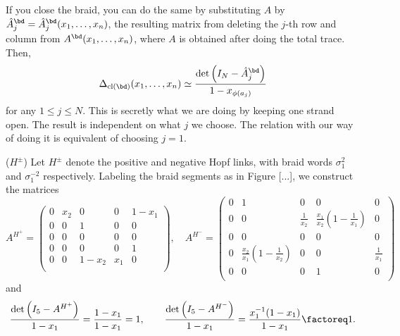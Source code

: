 \documentclass[11pt,e-only]{amsart}
\begin{document}
\begin{remark}
    If you close the braid, you can do the same by substituting $A$ by $\hat{A}_j^\bd=\hat{A}^\bd_j(x_1,\dots,x_n)$, the resulting matrix from deleting the $j$-th row and column from $A^\bd(x_1,\dots,x_n)$, where $A$ is obtained after doing the total trace. Then,
\begin{equation}
    \Delta_{\mathrm{cl}(\bd)}(x_1,\dots,x_n) \simeq \frac{\det{\left(I_{N}-\hat{A}^\bd_j\right)}}{1-x_{\phi(a_j)}}
\end{equation}
for any $1 \leq j\leq N$. This is secretly what we are doing by keeping one strand open. The result is independent on what $j$ we choose. The relation with our way of doing it is equivalent of choosing $j=1$.
\end{remark}

\begin{example} ($H^\pm$) Let $H^{\pm}$ denote the positive and negative Hopf links, with braid words $\sigma_1^2$ and $\sigma_1^{-2}$ respectively. Labeling the braid segments as in Figure [...], we construct the matrices
\begin{equation}
    A^{H^+}=\begin{pmatrix}
    0 & x_2 & 0 & 0 & 1-x_1 \\
    0 & 0 & 1 & 0 & 0\\
    0 & 0 & 0 & 0 & 0 \\
    0 & 0 & 0 & 0 & 1 \\
    0 & 0 & 1-x_2 & x_1 & 0 \\
    \end{pmatrix},
    \hspace{1em}
    A^{H^-}=\begin{pmatrix}
    0 & 1 & 0 & 0 & 0 \\
    0 & 0 & \frac{1}{x_2} & \frac{x_1}{x_2}\left(1-\frac{1}{x_1}\right) & 0 \\
    0 & 0 & 0 & 0 & 0 \\
    0 & \frac{x_2}{x_1}\left(1-\frac{1}{x_2}\right) & 0 & 0 & \frac{1}{x_1} \\
    0 & 0 & 0 & 1 & 0 \\
    \end{pmatrix}
\end{equation}
and
\begin{equation}
    \frac{\det\left(I_5-A^{H^+}\right)}{1-x_1}=\frac{1-x_1}{1-x_1}=1, \hspace{2em}\frac{\det\left(I_5-A^{H^-}\right)}{1-x_1}=\frac{x_1^{-1}(1-x_1)}{1-x_1}\factoreq 1.
\end{equation}
\end{example}
\end{document}
